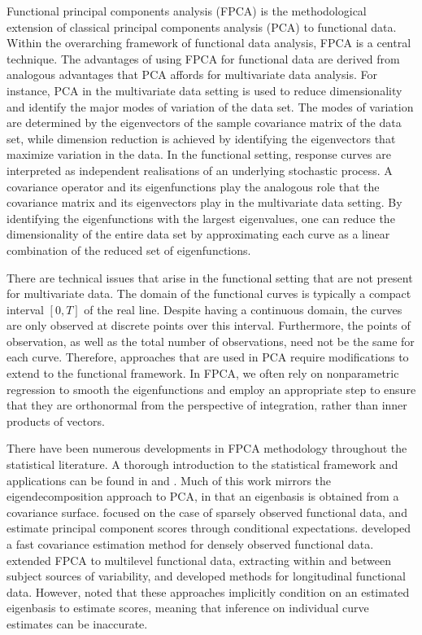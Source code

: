 \documentclass[12pt]{article}
\theoremstyle{plain}
\theoremstyle{definition}
\theoremstyle{remark}
\begin{document}
Functional principal components analysis (FPCA) is the methodological extension of classical principal
components analysis (PCA) to functional data. Within the overarching framework of functional data analysis,
FPCA is a central technique. The advantages of using FPCA for functional data are derived
from analogous advantages that PCA affords for multivariate data analysis. For instance, PCA in the multivariate
data setting is used to reduce dimensionality and identify the major modes of variation of the
data set. The modes of variation are determined by the eigenvectors of the sample covariance matrix of the data
set, while dimension reduction is achieved by identifying the eigenvectors that maximize variation in the data.
In the functional setting, response curves are interpreted as independent realisations of an underlying
stochastic process. A covariance operator and its eigenfunctions play the analogous
role that the covariance matrix and its eigenvectors play in the multivariate data setting. By identifying the
eigenfunctions with the largest eigenvalues, one can reduce the
dimensionality of the entire data set by approximating each curve as a linear combination of the reduced set
of eigenfunctions.

There are technical issues that arise in the functional setting that are not present for multivariate data.
The domain of the functional curves is typically a compact interval $[0, T]$ of the real line.
Despite having a continuous domain, the curves are only observed at discrete points over this interval.
Furthermore, the points of observation, as well as the total number of observations, need not be the
same for each curve. Therefore, approaches that are used in PCA require
modifications to extend to the functional framework.
In FPCA, we often rely on nonparametric regression to smooth the eigenfunctions and employ
an appropriate step to ensure that they are orthonormal from the perspective of integration, rather
than inner products of vectors.

There have been numerous developments in FPCA methodology throughout the statistical literature.
A thorough introduction to the statistical framework and applications can be found in 
and . Much of this work mirrors the eigendecomposition approach to PCA, in that an
eigenbasis is obtained from a covariance surface.  focused on the case of sparsely observed functional
data, and estimate
principal component scores through conditional expectations.  developed a fast covariance estimation method for densely observed functional data.  extended FPCA to multilevel functional data, extracting within and
between subject sources of variability, and  developed methods for longitudinal functional data. However,
 noted that these approaches implicitly condition on an estimated eigenbasis to estimate scores, meaning that inference on
individual curve estimates can be inaccurate.
\end{document}
